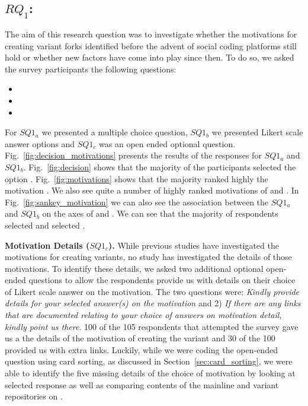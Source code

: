 \subsection*{\textbf{$RQ_1$: \RQOne}}
The aim of this research question was to investigate whether the motivations for creating variant forks identified before the advent of social coding platforms
still hold or whether new factors have come into play since then.
To do so, we asked the survey participants the following questions:

\begin{itemize}
\item \rqOneOne
\item \rqOneTwo
\item \rqOneThree
\end{itemize}


For $SQ1_{a}$ we presented a multiple choice question, $SQ1_{b}$ we presented Likert scale answer options and $SQ1_{c}$ was an open ended optional question.
 Fig.~\ref{fig:decision_motivations} presents the results of the responses for $SQ1_{a}$ and $SQ1_{b}$. Fig.~\ref{fig:decision} shows that the majority of the participants selected the option . Fig.~\ref{fig:motivations} shows that the majority ranked highly the motivation . We also see quite a number of highly ranked motivations of  and . In Fig.~\ref{fig:sankey_motivation} we can also see the association between the $SQ1_{a}$ and $SQ1_{b}$ on the axes of  and . We can see that the majority of respondents selected  and selected .


\nd \textbf{Motivation Details ($SQ1_{c}$).} While previous studies have investigated the motivations for creating variants, no study has investigated the details of those motivations.
To identify these details, we asked two additional optional open-ended questions to allow the respondents provide us with details on their choice of Likert scale answer on the motivation. The two questions were: \emph{Kindly provide details for your selected answer(s) on the motivation} and 2) \emph{If there are any links that are documented relating to your choice of answers on motivation detail, kindly point us there}. 100 of the 105 respondents that attempted the survey gave us a the details of the motivation of creating the variant and 30 of the 100 provided us with extra links. Luckily, while we were coding the open-ended question using card sorting, as discussed in Section~\ref{sec:card_sorting}, we were able to identify the five missing details of the choice of motivation by looking at selected response as well as comparing contents of the mainline and variant repositories on \gh.

